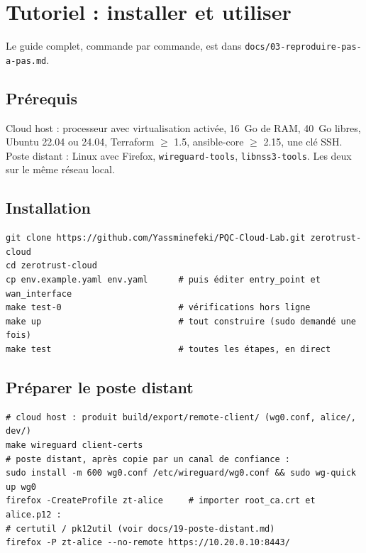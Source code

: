 \documentclass[11pt,a4paper]{article}
\newcommand{\cmd}[1]{\texttt{#1}}
\begin{document}
\section{Tutoriel : installer et utiliser}
Le guide complet, commande par commande, est dans \cmd{docs/03-reproduire-pas-a-pas.md}.

\subsection{Prérequis}
Cloud host : processeur avec virtualisation activée, 16~Go de RAM, 40~Go libres, Ubuntu 22.04 ou
24.04, Terraform $\geq$ 1.5, ansible-core $\geq$ 2.15, une clé SSH. Poste distant : Linux avec
Firefox, \cmd{wireguard-tools}, \cmd{libnss3-tools}. Les deux sur le même réseau local.

\subsection{Installation}
\begin{lstlisting}
git clone https://github.com/Yassminefeki/PQC-Cloud-Lab.git zerotrust-cloud
cd zerotrust-cloud
cp env.example.yaml env.yaml      # puis éditer entry_point et wan_interface
make test-0                       # vérifications hors ligne
make up                           # tout construire (sudo demandé une fois)
make test                         # toutes les étapes, en direct
\end{lstlisting}

\subsection{Préparer le poste distant}
\begin{lstlisting}
# cloud host : produit build/export/remote-client/ (wg0.conf, alice/, dev/)
make wireguard client-certs
# poste distant, après copie par un canal de confiance :
sudo install -m 600 wg0.conf /etc/wireguard/wg0.conf && sudo wg-quick up wg0
firefox -CreateProfile zt-alice     # importer root_ca.crt et alice.p12 :
# certutil / pk12util (voir docs/19-poste-distant.md)
firefox -P zt-alice --no-remote https://10.20.0.10:8443/
\end{lstlisting}
\end{document}
